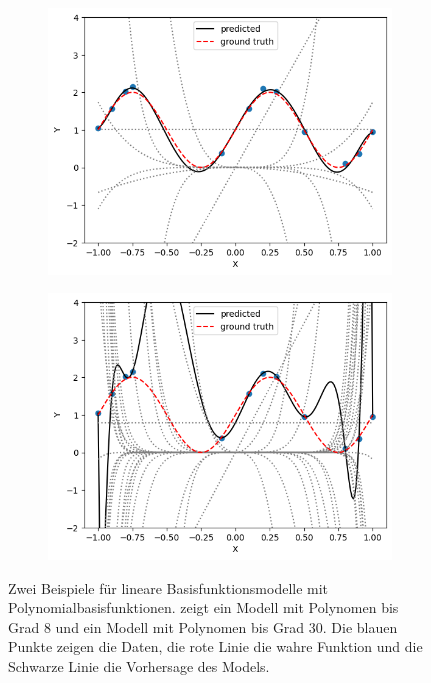 \begin{figure}[tb]
    \begin{subfigure}[b]{0.5\textwidth}
        \includegraphics[width=\textwidth]{Figures/ML-poly-regession.png}
        \caption{}
        \label{fig:ml-basisfunktionen-okfit}
    \end{subfigure}
    \hfill
    \begin{subfigure}[b]{0.5\textwidth}
        \includegraphics[width=\textwidth]{Figures/ML-poly-regession-overfitted.png}
        \caption{}
        \label{fig:ml-basisfunktionen-overfitted}
    \end{subfigure}
    \caption{Zwei Beispiele für lineare Basisfunktionsmodelle mit Polynomialbasisfunktionen.  zeigt ein Modell mit Polynomen bis Grad 8 und  ein Modell mit Polynomen bis Grad 30. 
    Die blauen Punkte zeigen die Daten, die rote Linie die wahre Funktion und die Schwarze Linie die Vorhersage des Models.}
    \label{fig:ml-basisfunktionen}
\end{figure}


